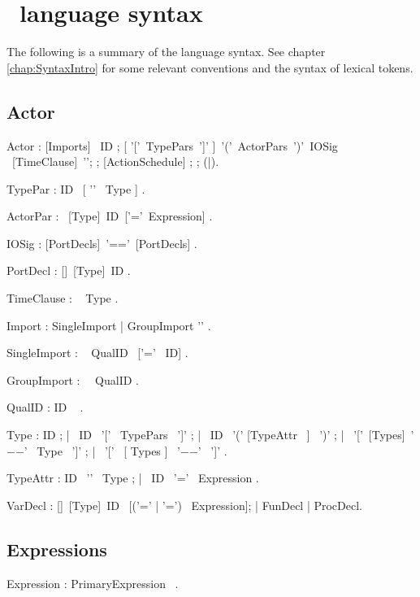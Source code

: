 

\chapter{\Cal ~language syntax}\label{app:Syntax}

The following is a summary of the \Cal language syntax. See
chapter \ref{chap:SyntaxIntro} for some relevant conventions and the
syntax of lexical tokens.

\section{Actor}

\bgr
Actor : [Imports] \kwActor ~ID ;
    [ '['~TypePars~']' ]~'('~ActorPars~')'~IOSig ~[TimeClause]~'\charColon';
     ;
    [ActionSchedule] ;
     ;
    (\kwEnd|\kwEndActor).

TypePar : ID~ [ '\charLess'~ Type ] .

ActorPar : ~[Type]~ID~['='~Expression] .

IOSig : [PortDecls]~'==\charMore'~[PortDecls] .

PortDecl : [\kwMulti]~[Type]~ID .

TimeClause : \kwTime~ Type .

Import : SingleImport | GroupImport '\charSemi' .

SingleImport : \kwImport~ QualID ~['=' ~ID] .

GroupImport : \kwImport ~\kwAll ~QualID .

QualID : ID ~ .

Type : ID ;
     | ~ID ~'[' ~TypePars ~']' ;
     | ~ID ~'(' [TypeAttr ~] ~')' ;
     | ~'['~[Types]~'$-$$-$\charMore' ~Type ~']' ;
     | ~'[' ~[ Types ] ~'$-$$-$\charMore' ~']' .

TypeAttr : ID ~'\charColon' ~Type ;
     | ~ID ~'=' ~Expression .

  VarDecl : [\kwMutable]~[Type]~ID ~[('=' | '\charColon=')
  ~Expression];
  | FunDecl | ProcDecl.

\egr

\section{Expressions}

\bgr

Expression : PrimaryExpression~ .

